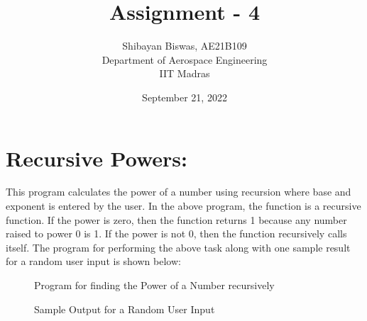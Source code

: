 \documentclass[12pt,a4paper]{article}
\author{ Shibayan Biswas, AE21B109\\ Department of Aerospace Engineering\\ IIT Madras}
\title{Assignment - 4}
\date{September 21, 2022}
\begin{document}
\maketitle
\hline
\section{Recursive Powers:}
This program calculates the power of a number using recursion where base and exponent is entered by the user. In the above program, the function is a recursive function. If the power is zero, then the function returns 1 because any number raised to power 0 is 1. If the power is not 0, then the function recursively calls itself. The program for performing the above task along with one sample result for a random user input is shown below:
\begin{figure}[!ht]
	\begin{center}
	\end{center}
	\caption{Program for finding the Power of a Number recursively}
\end{figure}
\clearpage
\begin{figure}[!ht]
	\begin{center}
	\end{center}
	\caption{Sample Output for a Random User Input}
\end{figure}
\end{document}
